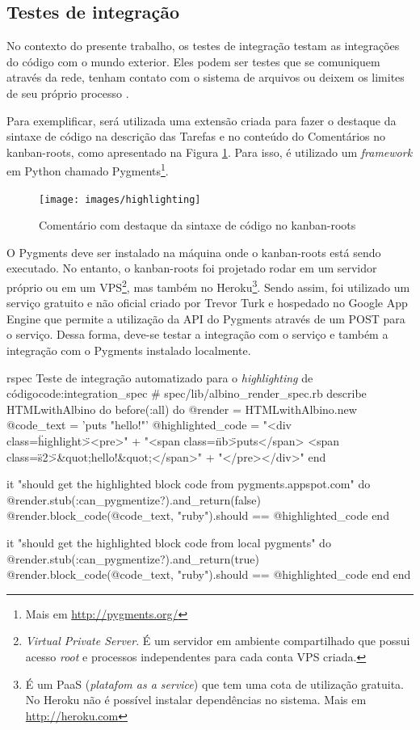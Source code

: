 
\subsection{Testes de integração}
\label{sub:testes_de_integracao}

No contexto do presente trabalho, os testes de integração testam as integrações do código com o mundo exterior. Eles podem ser testes que se comuniquem através da rede, tenham contato com o sistema de arquivos ou deixem os limites de seu próprio processo \cite{ArtOfAgileDevelopment}.

Para exemplificar, será utilizada uma extensão criada para fazer o destaque da sintaxe de código na descrição das Tarefas e no conteúdo do Comentários no kanban-roots, como apresentado na Figura \ref{img:highlighting}. Para isso, é utilizado um \textit{framework} em Python chamado Pygments\footnote{ Mais em \url{http://pygments.org/}}.

\begin{figure}[h]
  \center
  \caption{Comentário com destaque da sintaxe de código no kanban-roots}
  \texttt{[image: images/highlighting]}
  \label{img:highlighting}
\end{figure}

O Pygments deve ser instalado na máquina onde o kanban-roots está sendo executado. No entanto, o kanban-roots foi projetado rodar em um servidor próprio ou em um VPS\footnote{ \textit{Virtual Private Server}. É um servidor em ambiente compartilhado que possui acesso \textit{root} e processos independentes para cada conta VPS criada.}, mas também no Heroku\footnote{ É um PaaS (\textit{platafom as a service}) que tem uma cota de utilização gratuita. No Heroku não é possível instalar dependências no sistema. Mais em \url{http://heroku.com}}. Sendo assim, foi utilizado um serviço gratuito e não oficial criado por Trevor Turk e hospedado no Google App Engine que permite a utilização da API  do Pygments através de um POST para o serviço. Dessa forma, deve-se testar a integração com o serviço e também a integração com o Pygments instalado localmente.

\begin{mycode}{rspec}%
{Teste de integração automatizado para o \textit{highlighting} de código}{code:integration_spec}
# spec/lib/albino_render_spec.rb
describe HTMLwithAlbino do
  before(:all) do
    @render = HTMLwithAlbino.new
    @code_text = 'puts "hello!"'
    @highlighted_code =
      "<div class=\"highlight\"><pre>" +
        "<span class=\"nb\">puts</span> <span class=\"s2\">&quot;hello!&quot;</span>\n" +
      "</pre>\n</div>\n"
  end

  it "should get the highlighted block code from pygments.appspot.com" do
    @render.stub(:can_pygmentize?).and_return(false)
    @render.block_code(@code_text, "ruby").should == @highlighted_code
  end

  it "should get the highlighted block code from local pygments" do
    @render.stub(:can_pygmentize?).and_return(true)
    @render.block_code(@code_text, "ruby").should == @highlighted_code
  end
end
\end{mycode}

